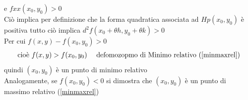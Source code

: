 \begin{defi}
\begin{equation*}
         \end{equation*}
         e $fxx(x_0,y_0)>0$\\
         Ciò implica per definizione che la forma quadratica associata ad $Hp(x_0,y_0)$ è positiva
         tutto ciò implica $d^2f(x_0+\theta h, y_0+\theta k)>0$\\
         Per cui $f(x,y)-f(x_0,y_0)>0$ 
         \begin{equation*}
           \begin{matrix}
              \text{cioè } f(x,y)>f(x_0,y_0) & \text{ defomozopmo di Minimo relativo (\ref{minmaxrel})}
           \end{matrix}
         \end{equation*}
         quindi $(x_0,y_0)$ è un punto di minimo relativo\\
         Analogamente, se $f(x_0,y_0)<0$ si dimostra che $(x_0,y_0)$ è un punto
		 di massimo relativo (\ref{minmaxrel})
\end{defi}
\clearpage
